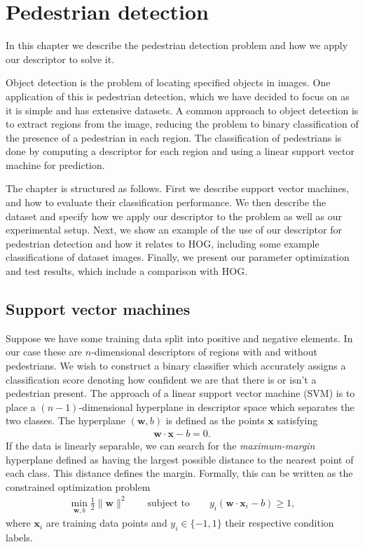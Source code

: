 \documentclass[thesis.tex]{subfiles}
\def\x{\mathbf{x}}
\def\w{\mathbf{w}}
\begin{document}
\chapter{Pedestrian detection}
\label{sec:od}
%
In this chapter we describe the pedestrian detection problem and how we apply our descriptor to solve it.

Object detection is the problem of locating specified objects in images. One application of this is pedestrian detection, which we have decided to focus on as it is simple and has extensive datasets. A common approach to object detection is to extract regions from the image, reducing the problem to binary classification of the presence of a pedestrian in each region. The classification of pedestrians is done by computing a descriptor for each region and using a linear support vector machine for prediction.

The chapter is structured as follows. First we describe support vector machines, and how to evaluate their classification performance. We then describe the dataset and specify how we apply our descriptor to the problem as well as our experimental setup. Next, we show an example of the use of our descriptor for pedestrian detection and how it relates to HOG, including some example classifications of dataset images. Finally, we present our parameter optimization and test results, which include a comparison with HOG.
%
\section{Support vector machines}
%
Suppose we have some training data split into positive and negative elements. In our case these are $n$-dimensional descriptors of regions with and without pedestrians. We wish to construct a binary classifier which accurately assigns a classification score denoting how confident we are that there is or isn't a pedestrian present. The approach of a linear support vector machine (SVM) is to place a $(n-1)$-dimensional hyperplane in descriptor space which separates the two classes. The hyperplane $(\w,b)$ is defined as the points $\x$ satisfying
%
\begin{align*}
\w \cdot \x - b = 0.
\end{align*}
%
If the data is linearly separable, we can search for the \emph{maximum-margin} hyperplane defined as having the largest possible distance to the nearest point of each class. This distance defines the margin. Formally, this can be written as the constrained optimization problem
%
\begin{align*}
\min_{\w,b} \frac12 \| \w \|^2 \qquad \text{subject to} \qquad y_i (\w \cdot \x_i - b) \geq 1,
\end{align*}
%
where $\x_i$ are training data points and $y_i \in \{-1,1\}$ their respective condition labels.
\end{document}
